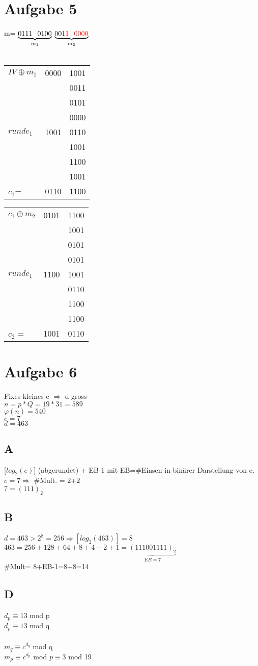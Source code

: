 \documentclass[10pt]{article}
\newcommand{\Ra}{\Rightarrow}
\begin{document}
\section{Aufgabe 5}
m= $\underbrace{0111\hspace{0.25cm} 0100}_{m_1}$ $\underbrace{001{\color{red}1\hspace{0.25cm}0000}}_{m_2}$ \\
\\

\begin{tabular}{l l l}
	$IV \oplus m_1$ & 0000 & 1001 \\
	& 	 & 0011 \\
	& 	 & 0101 \\
	& 	 & 0000 \\
	$runde_1$ & 1001 & 0110 \\
	& 	 & 1001 \\
	& 	 & 1100 \\
	& 	 & 1001 \\
	$c_1$= & 0110 & 1100 \\
\end{tabular}

\begin{tabular}{l l l}
	$c_1 \oplus m_2 $ & 0101 & 1100 \\
	& 	 & 1001 \\
	& 	 & 0101 \\
	& 	 & 0101 \\
	$runde_1$ & 1100 & 1001 \\
	& 	 & 0110 \\
	& 	 & 1100 \\
	& 	 & 1100 \\
	$c_2$ =  & 1001 & 0110 \\
\end{tabular}

\section{Aufgabe 6}
Fixes kleines e $\Ra$ d gross \\
$n=p*Q = 19*31=589$ \\
$\varphi(n)=540$ \\
$e=7$ \\
$d=463$ \\
\subsection{A}
[$log_2(e)$] (abgerundet) + EB-1 \hspace{2cm} mit EB=\#Einsen in binärer Darstellung von e. \\
$e=7 \Ra$ \#Mult. = 2+2 \\
$7=(111)_2$
\subsection{B}
$d=463 > 2^8=256 \Ra [log_2(463)]=8$ \\
$463=256+128+64+8+4+2+1=\underbrace{(111001111)_2}_{EB=7}$ \\
\#Mult= 8+EB-1=8+8=14
\subsection{D}
$d_p \equiv 13$ mod p \\
$d_p \equiv 13$ mod q \\
\\
$m_q \equiv c^{d_q}$ mod q \\
$m_p \equiv c^{d_p}$ mod $p \equiv 3$ mod 19 \\
\end{document}

